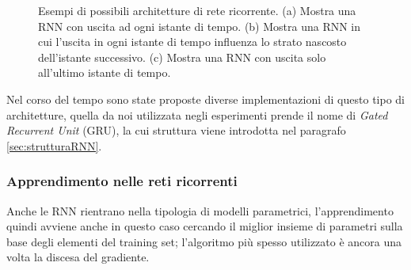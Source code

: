 \documentclass[../../main.tex]{subfiles}
\begin{document}
\begin{figure}[H]
\begin{subfigure}[t]{0.49\textwidth}
        \caption{} 
        \label{fig:RNNArch3}  
    \end{subfigure}
    \caption{Esempi di possibili architetture di rete ricorrente. (a) Mostra una RNN con uscita ad ogni istante di tempo. (b) Mostra una RNN in cui l'uscita in ogni istante di tempo influenza lo strato nascosto dell'istante successivo. (c) Mostra una RNN con uscita solo all'ultimo istante di tempo.}
\end{figure}

Nel corso del tempo sono state proposte diverse implementazioni di questo tipo di architetture, quella da noi utilizzata negli esperimenti prende il nome di \textit{Gated Recurrent Unit} (GRU), la cui struttura viene introdotta nel paragrafo \ref{sec:strutturaRNN}.

\subsubsection{Apprendimento nelle reti ricorrenti}
Anche le RNN rientrano nella tipologia di modelli parametrici, l'apprendimento quindi avviene anche in questo caso cercando il miglior insieme di parametri sulla base degli elementi del training set; l'algoritmo più spesso utilizzato è ancora una volta la discesa del gradiente.
\end{document}
